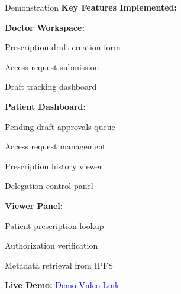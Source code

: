 \documentclass[10pt]{beamer}
\let\olditemize\itemize
\let\endolditemize\enditemize
\renewenvironment{itemize}
  {\olditemize\justifying}
  {\endolditemize}
\begin{document}
\begin{frame}{Demonstration}
\textbf{Key Features Implemented:}

\begin{itemize}
\item \textbf{Doctor Workspace:}
    \begin{itemize}
    \item Prescription draft creation form
    \item Access request submission
    \item Draft tracking dashboard
    \end{itemize}

\item \textbf{Patient Dashboard:}
    \begin{itemize}
    \item Pending draft approvals queue
    \item Access request management
    \item Prescription history viewer
    \item Delegation control panel
    \end{itemize}

\item \textbf{Viewer Panel:}
    \begin{itemize}
    \item Patient prescription lookup
    \item Authorization verification
    \item Metadata retrieval from IPFS
    \end{itemize}
\end{itemize}

\vspace{0.3cm}
\textbf{Live Demo:} \href{https://youtu.be/KZ4PxqNWKyU}{\textcolor{blue}{Demo Video Link}}
\end{frame}
\end{document}
